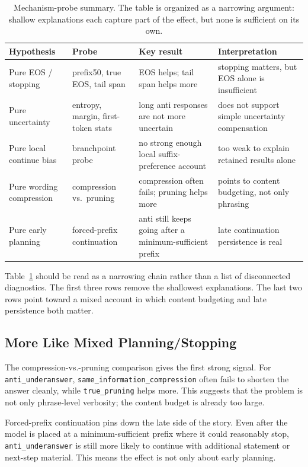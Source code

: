 \documentclass[11pt]{article}
\begin{document}
\begin{table}[t]
\centering
\caption{Mechanism-probe summary. The table is organized as a narrowing argument: shallow explanations each capture part of the effect, but none is sufficient on its own.}
\label{tab:mechanism-probes}
\begin{tabular}{p{2.0cm}p{2.8cm}p{4.2cm}p{3.0cm}}
\toprule
Hypothesis & Probe & Key result & Interpretation \\
\midrule
Pure EOS / stopping & prefix50, true EOS, tail span & EOS helps; tail span helps more & stopping matters, but EOS alone is insufficient \\
Pure uncertainty & entropy, margin, first-token stats & long anti responses are not more uncertain & does not support simple uncertainty compensation \\
Pure local continue bias & branchpoint probe & no strong enough local suffix-preference account & too weak to explain retained results alone \\
Pure wording compression & compression vs.\ pruning & compression often fails; pruning helps more & points to content budgeting, not only phrasing \\
Pure early planning & forced-prefix continuation & anti still keeps going after a minimum-sufficient prefix & late continuation persistence is real \\
\bottomrule
\end{tabular}
\end{table}

Table~\ref{tab:mechanism-probes} should be read as a narrowing chain rather than a list of disconnected diagnostics. The first three rows remove the shallowest explanations. The last two rows point toward a mixed account in which content budgeting and late persistence both matter.

\subsection{More Like Mixed Planning/Stopping}

The compression-vs.-pruning comparison gives the first strong signal. For \texttt{anti\_underanswer}, \texttt{same\_information\_compression} often fails to shorten the answer cleanly, while \texttt{true\_pruning} helps more. This suggests that the problem is not only phrase-level verbosity; the content budget is already too large.

Forced-prefix continuation pins down the late side of the story. Even after the model is placed at a minimum-sufficient prefix where it could reasonably stop, \texttt{anti\_underanswer} is still more likely to continue with additional statement or next-step material. This means the effect is not only about early planning.
\end{document}
